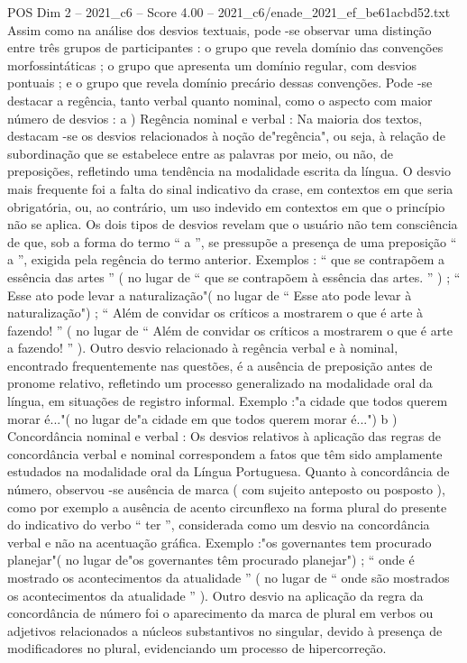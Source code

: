 \begin{textsample}{POS Dim 2 – 2021\_c6 – Score 4.00 – 2021\_c6/enade\_2021\_ef\_be61acbd52.txt}
Assim como na análise dos desvios textuais, pode -se observar uma distinção entre três grupos de participantes : o grupo que revela domínio das convenções morfossintáticas ; o grupo que apresenta um domínio regular, com desvios pontuais ; e o grupo que revela domínio precário dessas convenções.
Pode -se destacar a regência, tanto verbal quanto nominal, como o aspecto com maior número de desvios : a ) Regência nominal e verbal : Na maioria dos textos, destacam -se os desvios relacionados à noção de"regência", ou seja, à relação de subordinação que se estabelece entre as palavras por meio, ou não, de preposições, refletindo uma tendência na modalidade escrita da língua.
O desvio mais frequente foi a falta do sinal indicativo da crase, em contextos em que seria obrigatória, ou, ao contrário, um uso indevido em contextos em que o princípio não se aplica.
Os dois tipos de desvios revelam que o usuário não tem consciência de que, sob a forma do termo “ a ”, se pressupõe a presença de uma preposição “ a ”, exigida pela regência do termo anterior.
Exemplos : “ que se contrapõem a essência das artes ” ( no lugar de “ que se contrapõem à essência das artes. ” ) ; “ Esse ato pode levar a naturalização"( no lugar de “ Esse ato pode levar à naturalização") ; “ Além de convidar os críticos a mostrarem o que é arte à fazendo! ” ( no lugar de “ Além de convidar os críticos a mostrarem o que é arte a fazendo! ” ).
Outro desvio relacionado à regência verbal e à nominal, encontrado frequentemente nas questões, é a ausência de preposição antes de pronome relativo, refletindo um processo generalizado na modalidade oral da língua, em situações de registro informal.
Exemplo :"a cidade que todos querem morar é..."( no lugar de"a cidade em que todos querem morar é...") b ) Concordância nominal e verbal : Os desvios relativos à aplicação das regras de concordância verbal e nominal correspondem a fatos que têm sido amplamente estudados na modalidade oral da Língua Portuguesa.
Quanto à concordância de número, observou -se ausência de marca ( com sujeito anteposto ou posposto ), como por exemplo a ausência de acento circunflexo na forma plural do presente do indicativo do verbo “ ter ”, considerada como um desvio na concordância verbal e não na acentuação gráfica.
Exemplo :"os governantes tem procurado planejar"( no lugar de"os governantes têm procurado planejar") ; “ onde é mostrado os acontecimentos da atualidade ” ( no lugar de “ onde são mostrados os acontecimentos da atualidade ” ).
Outro desvio na aplicação da regra da concordância de número foi o aparecimento da marca de plural em verbos ou adjetivos relacionados a núcleos substantivos no singular, devido à presença de modificadores no plural, evidenciando um processo de hipercorreção.

\end{textsample}
